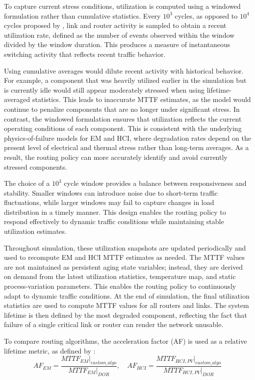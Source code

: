 To capture current stress conditions, utilization is computed using a windowed formulation rather than cumulative statistics. Every $10^3$ cycles, as opposed to $10^4$ cycles proposed by \cite{Clotho2015}, link and router activity is sampled to obtain a recent utilization rate, defined as the number of events observed within the window divided by the window duration. This produces a measure of instantaneous switching activity that reflects recent traffic behavior.

Using cumulative averages would dilute recent activity with historical behavior. For example, a component that was heavily utilized earlier in the simulation but is currently idle would still appear moderately stressed when using lifetime-averaged statistics. This leads to inaccurate MTTF estimates, as the model would continue to penalize components that are no longer under significant stress. In contrast, the windowed formulation ensures that utilization reflects the current operating conditions of each component. This is consistent with the underlying physics-of-failure models for EM and HCI, where degradation rates depend on the present level of electrical and thermal stress rather than long-term averages. As a result, the routing policy can more accurately identify and avoid currently stressed components.

The choice of a $10^3$ cycle window provides a balance between responsiveness and stability. Smaller windows can introduce noise due to short-term traffic fluctuations, while larger windows may fail to capture changes in load distribution in a timely manner. This design enables the routing policy to respond effectively to dynamic traffic conditions while maintaining stable utilization estimates.

Throughout simulation, these utilization snapshots are updated periodically and used to recompute EM and HCI MTTF estimates as needed. The MTTF values are not maintained as persistent aging state variables; instead, they are derived on demand from the latest utilization statistics, temperature map, and static process-variation parameters. This enables the routing policy to continuously adapt to dynamic traffic conditions. At the end of simulation, the final utilization statistics are used to compute MTTF values for all routers and links. The system lifetime is then defined by the most degraded component, reflecting the fact that failure of a single critical link or router can render the network unusable.

To compare routing algorithms, the acceleration factor (AF) is used as a relative lifetime metric, as defined by \cite{JEDEC122G}:
\begin{equation}
AF_{EM} = \frac{MTTF_{EM}|_{custom\_algo}}{MTTF_{EM}|_{DOR}}, 
\quad
AF_{HCI} = \frac{MTTF_{HCI,PV}|_{custom\_algo}}{MTTF_{HCI,PV}|_{DOR}}
\end{equation}

